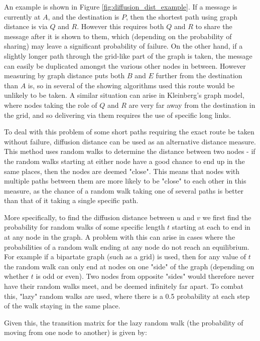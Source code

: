 \documentclass[bsc,frontabs,twoside,singlespacing,parskip,deptreport]{infthesis}     %
\begin{document}
An example is shown in Figure \ref{fig:diffusion_dist_example}. If a message is currently at $A$, and the destination is $P$, then the shortest path using graph distance is via $Q$ and $R$. However this requires both $Q$ and $R$ to share the message after it is shown to them, which (depending on the probability of sharing) may leave a significant probability of failure. On the other hand, if a slightly longer path through the grid-like part of the graph is taken, the message can easily be duplicated amongst the various other nodes in between. However measuring by graph distance puts both $B$ and $E$ further from the destination than $A$ is, so in several of the showing algorithms used this route would be unlikely to be taken. A similar situation can arise in Kleinberg's graph model, where nodes taking the role of $Q$ and $R$ are very far away from the destination in the grid, and so delivering via them requires the use of specific long links.

To deal with this problem of some short paths requiring the exact route be taken without failure, diffusion distance can be used as an alternative distance measure. This method uses random walks to determine the distance between two nodes - if the random walks starting at either node have a good chance to end up in the same places, then the nodes are deemed "close". This means that nodes with multiple paths between them are more likely to be "close" to each other in this measure, as the chance of a random walk taking one of several paths is better than that of it taking a single specific path.

More specifically, to find the diffusion distance between $u$ and $v$ we first find the probability for random walks of some specific length $t$ starting at each to end in at any node in the graph. A problem with this can arise in cases where the probabilities of a random walk ending at any node do not reach an equilibrium. For example if a bipartate graph (such as a grid) is used, then for any value of $t$ the random walk can only end at nodes on one "side" of the graph (depending on whether $t$ is odd or even). Two nodes from opposite "sides" would therefore never have their random walks meet, and be deemed infinitely far apart. To combat this, "lazy" random walks are used, where there is a 0.5 probability at each step of the walk staying in the same place.

Given this, the transition matrix for the lazy random walk (the probability of moving from one node to another) is given by:
\end{document}
